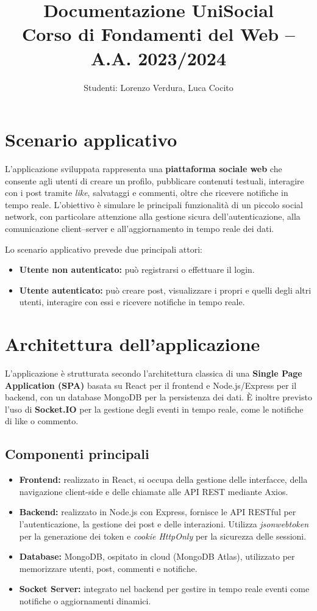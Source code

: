 \documentclass[a4paper,12pt]{article}
\title{\textbf{Documentazione UniSocial}\\\large Corso di Fondamenti del Web – A.A. 2023/2024}
\author{Studenti: Lorenzo Verdura, Luca Cocito}
\date{}
\begin{document}
\maketitle

\section{Scenario applicativo}
L’applicazione sviluppata rappresenta una \textbf{piattaforma sociale web} che consente agli utenti di creare un profilo, pubblicare contenuti testuali, interagire con i post tramite \textit{like}, salvataggi e commenti, oltre che ricevere notifiche in tempo reale.  
L’obiettivo è simulare le principali funzionalità di un piccolo social network, con particolare attenzione alla gestione sicura dell’autenticazione, alla comunicazione client–server e all’aggiornamento in tempo reale dei dati.

Lo scenario applicativo prevede due principali attori:
\begin{itemize}
    \item \textbf{Utente non autenticato:} può registrarsi o effettuare il login.
    \item \textbf{Utente autenticato:} può creare post, visualizzare i propri e quelli degli altri utenti, interagire con essi e ricevere notifiche in tempo reale.
\end{itemize}

\section{Architettura dell’applicazione}
L’applicazione è strutturata secondo l’architettura classica di una \textbf{Single Page Application (SPA)} basata su React per il frontend e Node.js/Express per il backend, con un database MongoDB per la persistenza dei dati.  
È inoltre previsto l’uso di \textbf{Socket.IO} per la gestione degli eventi in tempo reale, come le notifiche di like o commento.

\subsection{Componenti principali}
\begin{itemize}
    \item \textbf{Frontend:} realizzato in React, si occupa della gestione delle interfacce, della navigazione client-side e delle chiamate alle API REST mediante Axios.
    \item \textbf{Backend:} realizzato in Node.js con Express, fornisce le API RESTful per l’autenticazione, la gestione dei post e delle interazioni. Utilizza \textit{jsonwebtoken} per la generazione dei token e \textit{cookie HttpOnly} per la sicurezza delle sessioni.
    \item \textbf{Database:} MongoDB, ospitato in cloud (MongoDB Atlas), utilizzato per memorizzare utenti, post, commenti e notifiche.
    \item \textbf{Socket Server:} integrato nel backend per gestire in tempo reale eventi come notifiche o aggiornamenti dinamici.
\end{itemize}
\end{document}
